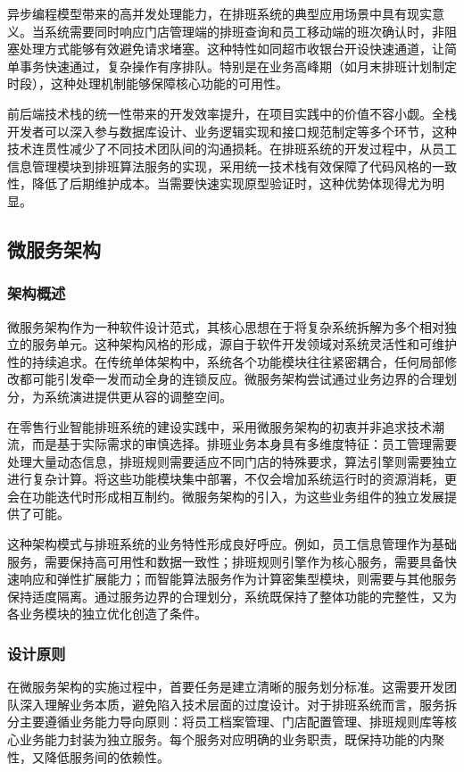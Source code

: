 \documentclass{ctexart}
\begin{document}
异步编程模型带来的高并发处理能力，在排班系统的典型应用场景中具有现实意义。当系统需要同时响应门店管理端的排班查询和员工移动端的班次确认时，非阻塞处理方式能够有效避免请求堵塞。这种特性如同超市收银台开设快速通道，让简单事务快速通过，复杂操作有序排队。特别是在业务高峰期（如月末排班计划制定时段），这种处理机制能够保障核心功能的可用性。

前后端技术栈的统一性带来的开发效率提升，在项目实践中的价值不容小觑。全栈开发者可以深入参与数据库设计、业务逻辑实现和接口规范制定等多个环节，这种技术连贯性减少了不同技术团队间的沟通损耗。在排班系统的开发过程中，从员工信息管理模块到排班算法服务的实现，采用统一技术栈有效保障了代码风格的一致性，降低了后期维护成本。当需要快速实现原型验证时，这种优势体现得尤为明显。

\subsection{微服务架构}
\subsubsection{架构概述}
微服务架构作为一种软件设计范式，其核心思想在于将复杂系统拆解为多个相对独立的服务单元。这种架构风格的形成，源自于软件开发领域对系统灵活性和可维护性的持续追求。在传统单体架构中，系统各个功能模块往往紧密耦合，任何局部修改都可能引发牵一发而动全身的连锁反应。微服务架构尝试通过业务边界的合理划分，为系统演进提供更从容的调整空间。

在零售行业智能排班系统的建设实践中，采用微服务架构的初衷并非追求技术潮流，而是基于实际需求的审慎选择。排班业务本身具有多维度特征：员工管理需要处理大量动态信息，排班规则需要适应不同门店的特殊要求，算法引擎则需要独立进行复杂计算。将这些功能模块集中部署，不仅会增加系统运行时的资源消耗，更会在功能迭代时形成相互制约。微服务架构的引入，为这些业务组件的独立发展提供了可能。

这种架构模式与排班系统的业务特性形成良好呼应。例如，员工信息管理作为基础服务，需要保持高可用性和数据一致性；排班规则引擎作为核心服务，需要具备快速响应和弹性扩展能力；而智能算法服务作为计算密集型模块，则需要与其他服务保持适度隔离。通过服务边界的合理划分，系统既保持了整体功能的完整性，又为各业务模块的独立优化创造了条件。

\subsubsection{设计原则}
在微服务架构的实施过程中，首要任务是建立清晰的服务划分标准。这需要开发团队深入理解业务本质，避免陷入技术层面的过度设计。对于排班系统而言，服务拆分主要遵循业务能力导向原则：将员工档案管理、门店配置管理、排班规则库等核心业务能力封装为独立服务。每个服务对应明确的业务职责，既保持功能的内聚性，又降低服务间的依赖性。
\end{document}
